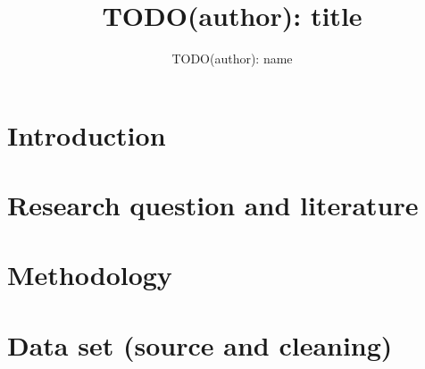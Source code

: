 \IfFileExists{siamart220329.cls}{\siamtrue\documentclass{siamart220329}}{\documentclass[11pt]{article}}
\title{TODO(author): title}
\author{TODO(author): name}
\date{}
\newcommand{\fitwidth}[1]{\resizebox{\ifdim\width>\linewidth\linewidth\else\width\fi}{!}{#1}}
\begin{document}
\maketitle

\begin{abstract}
\end{abstract}

\section{Introduction}

\section{Research question and literature}

\section{Methodology}

\section{Data set (source and cleaning)}
\begin{table}[t]
\centering
\caption{Buildings removed by each pool filter at both cut-offs. TODO caption (author).}\label{tab:pool_filters}
\fitwidth{}
\end{table}

\begin{table}[t]
\centering
\caption{First installations by start year in the September and November 2026 plant files. TODO caption (author).}\label{tab:register_lag}
\fitwidth{}
\end{table}

\begin{table}[t]
\centering
\caption{Buildings and adoption rate by building category and number of dwellings. TODO caption (author).}\label{tab:adoption_by_type}
\fitwidth{}
\end{table}
\end{document}
